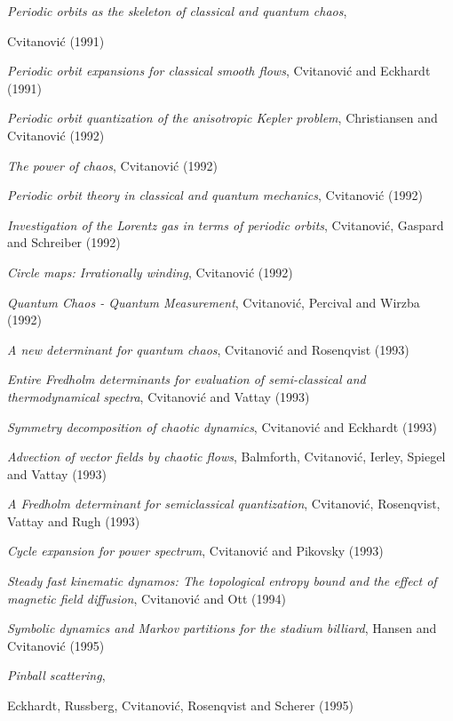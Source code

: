 {\em Periodic orbits as the skeleton of classical and quantum chaos},
{Cvitanovi{\'c}
{(1991)}

{\em Periodic orbit expansions for classical smooth flows},
{Cvitanovi{\'c} and Eckhardt}
{(1991)}

{\em Periodic orbit quantization of the anisotropic {Kepler} problem},
{Christiansen and Cvitanovi{\'c}}
{(1992)}

{\em The power of chaos},
{Cvitanovi{\'c}}
{(1992)}

{\em Periodic orbit theory in classical and quantum mechanics},
{Cvitanovi{\'c}}
{(1992)}

{\em Investigation of the {Lorentz} gas in terms of periodic orbits},
{Cvitanovi{\'c}, Gaspard and Schreiber}
{(1992)}

 {\em Circle maps: {Irrationally} winding},
{Cvitanovi{\'c}}
{(1992)}

{\em {Quantum Chaos - Quantum Measurement}},
{Cvitanovi{\'c}, Percival and Wirzba}
{(1992)}

{\em A new determinant for quantum chaos},
{Cvitanovi{\'c} and Rosenqvist}
{(1993)}

{\em Entire {Fredholm} determinants for evaluation of semi-classical and
thermodynamical spectra},
{Cvitanovi{\'c} and Vattay}
{(1993)}

{\em Symmetry decomposition of chaotic dynamics},
{Cvitanovi{\'c} and Eckhardt}
{(1993)}

{\em Advection of vector fields by chaotic flows},
{Balmforth, Cvitanovi{\'c}, Ierley, Spiegel and Vattay}
{(1993)}

{\em A {Fredholm} determinant for semiclassical quantization},
{Cvitanovi{\'c}, Rosenqvist, Vattay and Rugh}
{(1993)}

{\em Cycle expansion for power spectrum},
{Cvitanovi{\'c} and Pikovsky}
{(1993)}

{\em Steady fast kinematic dynamos: {The} topological entropy bound and
the effect of magnetic field diffusion},
{Cvitanovi\'c and Ott}
{(1994)}

{\em Symbolic dynamics and {Markov} partitions for the stadium billiard},
{Hansen and Cvitanovi{\'c}}
{(1995)}

{\em Pinball scattering},
{Eckhardt, Russberg, Cvitanovi{\'c, Rosenqvist and Scherer}
{(1995)}

}}
